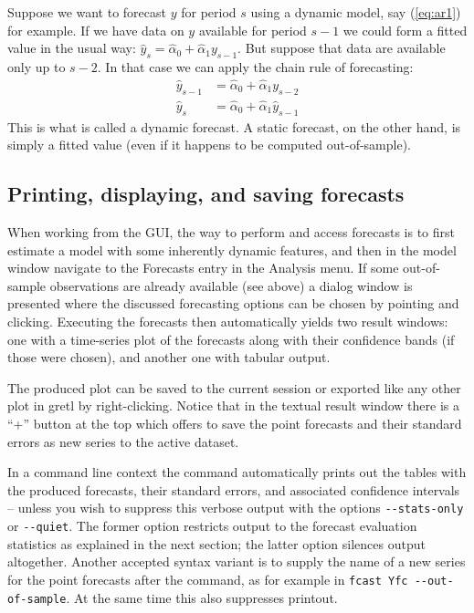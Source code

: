 Suppose we want to forecast $y$ for period $s$ using a dynamic model,
say (\ref{eq:ar1}) for example.  If we have data on $y$ available for
period $s-1$ we could form a fitted value in the usual way: $\hat{y}_s
= \hat{\alpha}_0 + \hat{\alpha}_1 y_{s-1}$.  But suppose that data are
available only up to $s-2$.  In that case we can apply the chain rule
of forecasting:
%
\begin{align*}
  \hat{y}_{s-1} &= \hat{\alpha}_0 + \hat{\alpha}_1 y_{s-2} \\
  \hat{y}_{s} &= \hat{\alpha}_0 + \hat{\alpha}_1 \hat{y}_{s-1}
\end{align*}
%
This is what is called a dynamic forecast.  A static forecast, on the
other hand, is simply a fitted value (even if it happens to be computed
out-of-sample).

\subsection{Printing, displaying, and saving forecasts}

When working from the GUI, the way to perform and access forecasts is to
first estimate a model with some inherently dynamic features, and then 
in the model window navigate to the Forecasts entry in the Analysis 
menu. If some out-of-sample observations are already available (see 
above) a dialog window is presented where the discussed forecasting 
options can be chosen by pointing and clicking. Executing the forecasts
then automatically yields two result windows: one with a time-series
plot of the forecasts along with their confidence bands (if those were
chosen), and another one with tabular output.

The produced plot can be saved to the current session or exported like
any other plot in gretl by right-clicking. Notice that in the textual
result window there is a ``+'' button at the top which offers to save
the point forecasts and their standard errors as new series to the
active dataset. 

In a command line context the  command automatically prints 
out the tables with the produced forecasts, their standard errors, and 
associated confidence intervals -- unless you wish to suppress this 
verbose output with the options \verb|--stats-only| or \verb|--quiet|. 
The former option restricts output to the forecast evaluation statistics
as explained in the next section; the latter option silences output 
altogether. Another accepted syntax variant is to supply the name of a
new series for the point forecasts after the  command, as for
example in \verb|fcast Yfc --out-of-sample|. At the same time this also
suppresses printout. 

